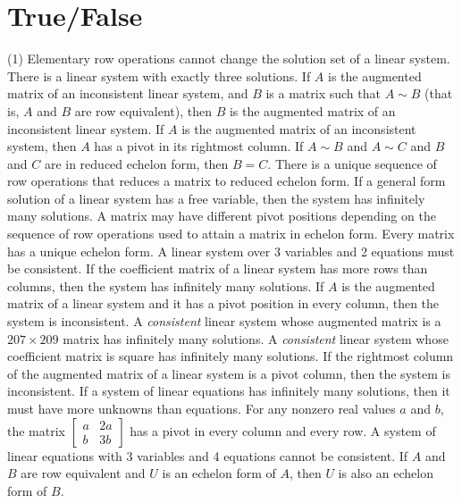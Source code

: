 \section{True/False}

\trueFalseHeader

\begin{tasks}[resume, style=enumerate](1)
\task
  Elementary row operations cannot change the solution set of a linear
  system.
\task
  There is a linear system with exactly three solutions.
\task
  If $A$ is the augmented matrix of an inconsistent linear system, and
  $B$ is a matrix such that $A \sim B$ (that is, $A$ and $B$ are row
  equivalent), then $B$ is the augmented matrix of an inconsistent
  linear system.
\task
  If $A$ is the augmented matrix of an inconsistent system, then $A$
  has a pivot in its rightmost column.
\task
  If $A \sim B$ and $A \sim C$ and $B$ and $C$ are in reduced echelon
  form, then $B = C$.
\task
  There is a unique sequence of row operations that reduces a matrix
  to reduced echelon form.
\task
  If a general form solution of a linear system has a free variable,
  then the system has infinitely many solutions.
\task
  A matrix may have different pivot positions depending on the
  sequence of row operations used to attain a matrix in echelon form.
\task
  Every matrix has a unique echelon form.
\task
  A linear system over 3 variables and 2 equations must be consistent.
\task
  If the coefficient matrix of a linear system has more rows than
  columns, then the system has infinitely many solutions.
\task
  If $A$ is the augmented matrix of a linear system and it has a pivot
  position in every column, then the system is inconsistent.
\task
  A \textit{consistent} linear system whose augmented matrix is a $207
  \times 209$ matrix has infinitely many solutions.
\task
  A \textit{consistent} linear system whose coefficient matrix is
  square has infinitely many solutions.
\task
  If the rightmost column of the augmented matrix of a linear system
  is a pivot column, then the system is inconsistent.
\task
  If a system of linear equations has infinitely
  many solutions, then it must have more unknowns than equations.
\task
  For any nonzero real values $a$ and $b$, the matrix
  $
  \begin{bmatrix}
    a & 2a \\
    b & 3b
  \end{bmatrix}
  $
  has a pivot in every column and every row.
\task
  A system of linear equations with 3 variables and 4 equations cannot
  be consistent.
\task
  If $A$ and $B$ are row equivalent and $U$ is an echelon form of $A$,
  then $U$ is also an echelon form of $B$.
\end{tasks}

